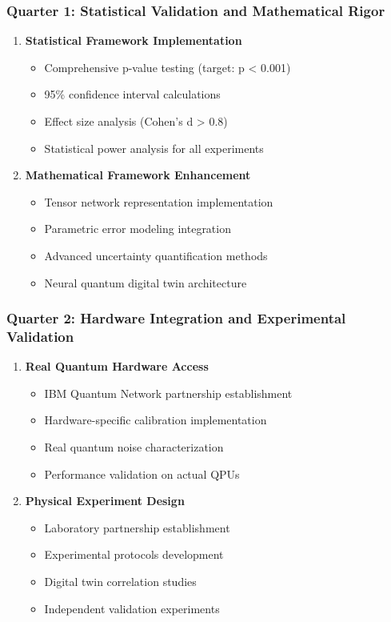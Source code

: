 \documentclass[12pt,a4paper]{article}
\begin{document}
\subsubsection{Quarter 1: Statistical Validation and Mathematical Rigor}
\begin{enumerate}
    \item \textbf{Statistical Framework Implementation}
    \begin{itemize}
        \item Comprehensive p-value testing (target: p < 0.001)
        \item 95\% confidence interval calculations
        \item Effect size analysis (Cohen's d > 0.8)
        \item Statistical power analysis for all experiments
    \end{itemize}
    
    \item \textbf{Mathematical Framework Enhancement}
    \begin{itemize}
        \item Tensor network representation implementation
        \item Parametric error modeling integration
        \item Advanced uncertainty quantification methods
        \item Neural quantum digital twin architecture
    \end{itemize}
\end{enumerate}

\subsubsection{Quarter 2: Hardware Integration and Experimental Validation}
\begin{enumerate}
    \item \textbf{Real Quantum Hardware Access}
    \begin{itemize}
        \item IBM Quantum Network partnership establishment
        \item Hardware-specific calibration implementation
        \item Real quantum noise characterization
        \item Performance validation on actual QPUs
    \end{itemize}
    
    \item \textbf{Physical Experiment Design}
    \begin{itemize}
        \item Laboratory partnership establishment
        \item Experimental protocols development
        \item Digital twin correlation studies
        \item Independent validation experiments
    \end{itemize}
\end{enumerate}
\end{document}
